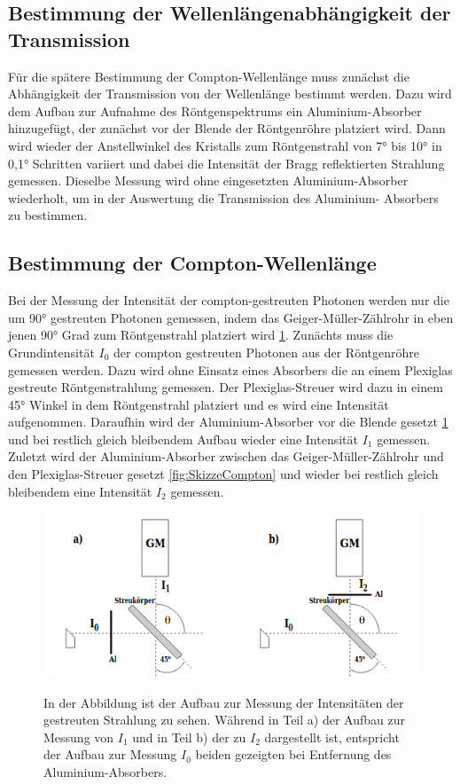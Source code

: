 \documentclass[titlepage = firstcover]{scrartcl}
\begin{document}
        \subsection{Bestimmung der Wellenlängenabhängigkeit der Transmission}
        Für die spätere Bestimmung der Compton-Wellenlänge muss zunächst die Abhängigkeit der Transmission von der Wellenlänge bestimmt werden. Dazu wird dem
        Aufbau zur Aufnahme des Röntgenspektrums ein Aluminium-Absorber hinzugefügt, der zunächst vor der Blende der Röntgenröhre platziert wird. Dann wird 
        wieder der Anstellwinkel des Kristalls zum Röntgenstrahl von 7° bis 10° in 0,1° Schritten variiert und dabei die Intensität der Bragg reflektierten
        Strahlung gemessen. Dieselbe Messung wird ohne eingesetzten Aluminium-Absorber wiederholt, um in der Auswertung die Transmission des Aluminium-
        Absorbers zu bestimmen.

        \subsection{Bestimmung der Compton-Wellenlänge}
        Bei der Messung der Intensität der compton-gestreuten Photonen werden nur die um 90° gestreuten Photonen gemessen, indem das Geiger-Müller-Zählrohr
        in eben jenen 90° Grad zum Röntgenstrahl platziert wird \ref{fig:SkizzeAbsorber}. 
        Zunächts muss die Grundintensität $I_0$ der compton gestreuten Photonen aus der Röntgenröhre gemessen werden. Dazu wird ohne Einsatz eines Absorbers
        die an einem Plexiglas gestreute Röntgenstrahlung gemessen. Der Plexiglas-Streuer wird dazu in einem 45° Winkel in dem Röntgenstrahl platziert und es 
        wird eine Intensität aufgenommen. Daraufhin wird der Aluminium-Absorber vor die Blende gesetzt \ref{fig:SkizzeAbsorber} und bei restlich gleich bleibendem Aufbau wieder
        eine Intensität $I_1$ gemessen. Zuletzt wird der Aluminium-Absorber zwischen das Geiger-Müller-Zählrohr und den Plexiglas-Streuer gesetzt  
        \ref{fig:SkizzeCompton} und wieder bei restlich gleich bleibendem eine Intensität $I_2$ gemessen.

        \FloatBarrier
        \begin{figure}[h]
            \centering
            \caption{In der Abbildung ist der Aufbau zur Messung der Intensitäten der gestreuten Strahlung zu sehen. Während in Teil a) der Aufbau zur Messung von $I_1$ und in Teil b) der zu $I_2$ dargestellt ist, entspricht der Aufbau zur Messung $I_0$ beiden gezeigten bei Entfernung des Aluminium-Absorbers.}
            \includegraphics[width = 0.8\linewidth]{absorber.png}
            \label{fig:SkizzeAbsorber}
        \end{figure} 
        \FloatBarrier
        \newpage
\end{document}
